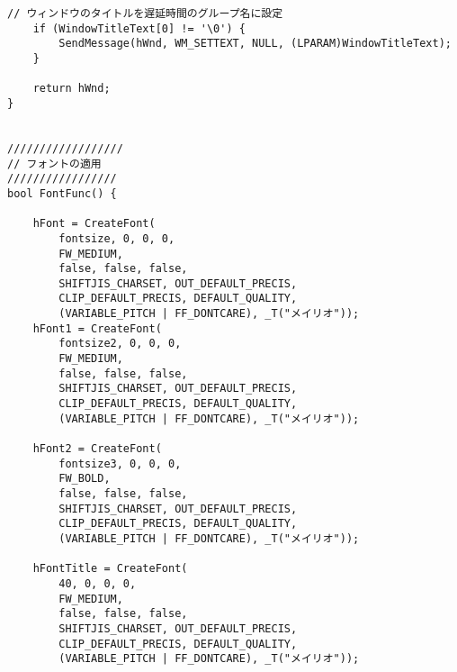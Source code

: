 \begin{lstlisting}[caption=window.cpp]
	// ウィンドウのタイトルを遅延時間のグループ名に設定
	if (WindowTitleText[0] != '\0') {
		SendMessage(hWnd, WM_SETTEXT, NULL, (LPARAM)WindowTitleText);
	}
	
	return hWnd;
}


//////////////////
// フォントの適用
/////////////////
bool FontFunc() {

	hFont = CreateFont(
		fontsize, 0, 0, 0,
		FW_MEDIUM,
		false, false, false,
		SHIFTJIS_CHARSET, OUT_DEFAULT_PRECIS,
		CLIP_DEFAULT_PRECIS, DEFAULT_QUALITY,
		(VARIABLE_PITCH | FF_DONTCARE), _T("メイリオ"));
	hFont1 = CreateFont(
		fontsize2, 0, 0, 0,
		FW_MEDIUM,
		false, false, false,
		SHIFTJIS_CHARSET, OUT_DEFAULT_PRECIS,
		CLIP_DEFAULT_PRECIS, DEFAULT_QUALITY,
		(VARIABLE_PITCH | FF_DONTCARE), _T("メイリオ"));

	hFont2 = CreateFont(
		fontsize3, 0, 0, 0,
		FW_BOLD,
		false, false, false,
		SHIFTJIS_CHARSET, OUT_DEFAULT_PRECIS,
		CLIP_DEFAULT_PRECIS, DEFAULT_QUALITY,
		(VARIABLE_PITCH | FF_DONTCARE), _T("メイリオ"));

	hFontTitle = CreateFont(
		40, 0, 0, 0,
		FW_MEDIUM,
		false, false, false,
		SHIFTJIS_CHARSET, OUT_DEFAULT_PRECIS,
		CLIP_DEFAULT_PRECIS, DEFAULT_QUALITY,
		(VARIABLE_PITCH | FF_DONTCARE), _T("メイリオ"));


\end{lstlisting}
